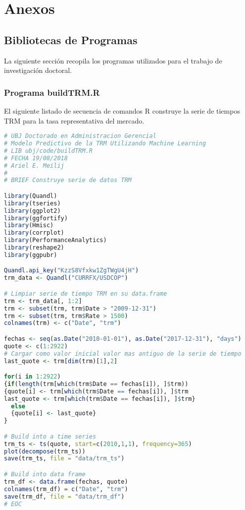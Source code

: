 \setcounter{chapter}{7}
\chapter{Anexos}


\section{Bibliotecas de Programas}
La siguiente sección recopila los programas utilizados para el trabajo de investigación doctoral.

\subsection{Programa buildTRM.R}
El siguiente listado de secuencia de comandos R construye la serie de tiempos TRM para la tasa representativa del mercado.

\begin{lstlisting}[language=R]
# UBJ Doctorado en Administracion Gerencial
# Modelo Predictivo de la TRM Utilizando Machine Learning
# LIB ubj/code/buildTRM.R 
# FECHA 19/08/2018
# Ariel E. Meilij
#
# BRIEF Construye serie de datos TRM

library(Quandl)
library(tseries)
library(ggplot2)
library(ggfortify)
library(Hmisc)
library(corrplot)
library(PerformanceAnalytics)
library(reshape2)
library(ggpubr)

Quandl.api_key("KzzS8Vfxkw1ZgTWgU4jH")
trm_data <- Quandl("CURRFX/USDCOP")

# Limpiar serie de tiempo TRM en su data.frame
trm <- trm_data[, 1:2]
trm <- subset(trm, trm$Date > "2009-12-31")
trm <- subset(trm, trm$Rate > 1500)
colnames(trm) <- c("Date", "trm")

fechas <- seq(as.Date("2010-01-01"), as.Date("2017-12-31"), "days")
quote <- c(1:2922)
# Cargar como valor inicial valor mas antiguo de la serie de tiempo
last_quote <- trm[dim(trm)[1],2]

for(i in 1:2922)
{if(length(trm[which(trm$Date == fechas[i]), ]$trm))
{quote[i] <- trm[which(trm$Date == fechas[i]), ]$trm
last_quote <- trm[which(trm$Date == fechas[i]), ]$trm}
  else
  {quote[i] <- last_quote}
}

# Build into a time series
trm_ts <- ts(quote, start=c(2010,1,1), frequency=365)
plot(decompose(trm_ts))
save(trm_ts, file = "data/trm_ts")

# Build into data frame
trm_df <- data.frame(fechas, quote)
colnames(trm_df) = c("Date", "trm")
save(trm_df, file = "data/trm_df")
# EOC
\end{lstlisting}

